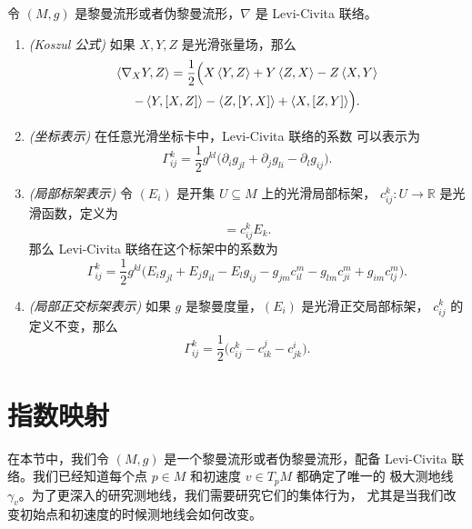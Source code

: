 \documentclass[fontset=none]{Notes}
\newcommand{\inn}[1]{\left\langle #1\right\rangle}
\begin{document}
\begin{corollary}
  令 $(M,g)$ 是黎曼流形或者伪黎曼流形，$\nabla$ 是 Levi-Civita 联络。
  \begin{enumerate}
    \item \emph{(Koszul 公式)} 如果 $X,Y,Z$ 是光滑张量场，那么
    \begin{multline}
      \inn{\nabla_XY,Z}=\frac{1}{2}\Bigl(X\inn{Y,Z}+Y\inn{Z,X}-Z\inn{X,Y}\\
      -\inn{Y,[X,Z]}-\inn{Z,[Y,X]}+
      \inn{X,[Z,Y]}\Bigr).
    \end{multline}
    \item \emph{(坐标表示)} 在任意光滑坐标卡中，Levi-Civita 联络的系数
    可以表示为
    \begin{equation}
      \Gamma_{ij}^k=\frac{1}{2}g^{kl}\bigl(\partial_i g_{jl}+\partial_j g_{li}-\partial_l g_{ij}\bigr).
    \end{equation}
    \item \emph{(局部标架表示)} 令 $(E_i)$ 是开集 $U\subseteq M$ 上的光滑局部标架，
    $c_{ij}^k:U\to \mathbb{R}$ 是光滑函数，定义为
    \begin{equation}
      [E_i,E_j]=c_{ij}^kE_k.
    \end{equation}
    那么 Levi-Civita 联络在这个标架中的系数为
    \begin{equation}
      \Gamma_{ij}^k=\frac{1}{2}g^{kl}\bigl(E_ig_{jl}+E_jg_{il}-E_lg_{ij}-g_{jm}c_{il}^m-g_{lm}c_{ji}^m+g_{im}c_{lj}^m\bigr).
    \end{equation}
    \item \emph{(局部正交标架表示)} 如果 $g$ 是黎曼度量，$(E_i)$ 是光滑正交局部标架，
    $c_{ij}^k$ 的定义不变，那么
    \begin{equation}
      \Gamma_{ij}^k=\frac{1}{2}\bigl(c_{ij}^k-c_{ik}^j-c_{jk}^i\bigr).
    \end{equation}
  \end{enumerate}
\end{corollary}

\section{指数映射}

在本节中，我们令 $(M,g)$ 是一个黎曼流形或者伪黎曼流形，配备 Levi-Civita
联络。我们已经知道每个点 $p\in M$ 和初速度 $v\in T_pM$ 都确定了唯一的
极大测地线 $\gamma_v$。为了更深入的研究测地线，我们需要研究它们的集体行为，
尤其是当我们改变初始点和初速度的时候测地线会如何改变。
\end{document}
